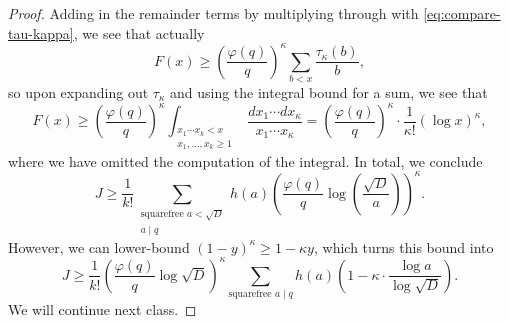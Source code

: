 \documentclass[../notes.tex]{subfiles}
\begin{document}
\begin{proof}
	Adding in the remainder terms by multiplying through with \eqref{eq:compare-tau-kappa}, we see that actually
	\[F(x)\ge\left(\frac{\varphi(q)}q\right)^{\kappa}\sum_{b<x}\frac{\tau_\kappa(b)}b,\]
	so upon expanding out $\tau_\kappa$ and using the integral bound for a sum, we see that
	\[F(x)\ge\left(\frac{\varphi(q)}q\right)^{\kappa}\int_{\substack{x_1\cdots x_k<x\\x_1,\ldots,x_k\ge1}}\frac{dx_1\cdots dx_\kappa}{x_1\cdots x_\kappa}=\left(\frac{\varphi(q)}q\right)^\kappa\cdot\frac1{\kappa!}(\log x)^\kappa,\]
	where we have omitted the computation of the integral. In total, we conclude
	\[J\ge\frac1{k!}\sum_{\substack{\text{squarefree }a<\sqrt D\\a\mid q}}h(a)\left(\frac{\varphi(q)}q\log\left(\frac{\sqrt D}a\right)\right)^\kappa.\]
	However, we can lower-bound $(1-y)^\kappa\ge1-\kappa y$, which turns this bound into
	\[J\ge\frac1{k!}\left(\frac{\varphi(q)}q\log\sqrt D\right)^\kappa\sum_{\text{squarefree }a\mid q}h(a)\left(1-\kappa\cdot\frac{\log a}{\log\sqrt D}\right).\]
	We will continue next class.
\end{proof}
\end{document}
